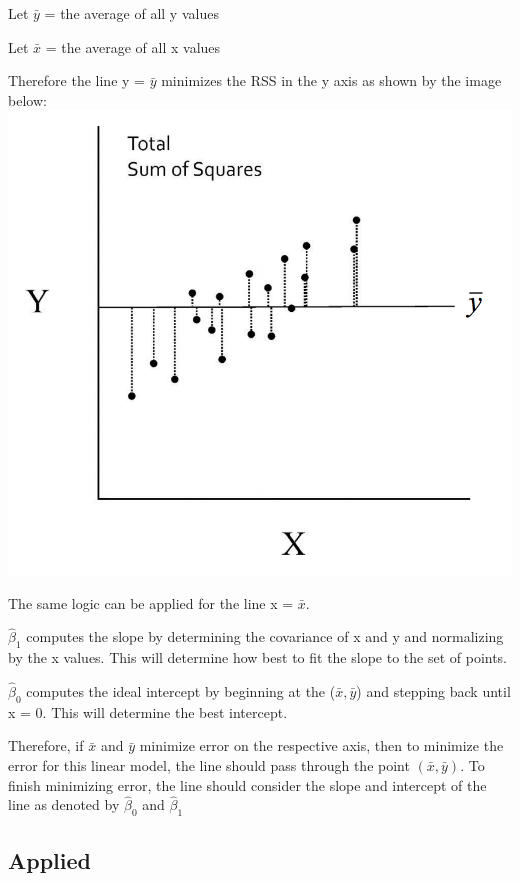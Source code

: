 \documentclass[11pt]{article}
\makeatletter
\def\maxwidth{\ifdim\Gin@nat@width>\linewidth\linewidth
    \else\Gin@nat@width\fi}
\let\Oldincludegraphics\includegraphics
\renewcommand{\includegraphics}[1]{\Oldincludegraphics[width=.8\maxwidth]{#1}}
\makeatother
\begin{document}
    Let \(\bar{y}\) = the average of all y values

Let \(\bar{x}\) = the average of all x values

Therefore the line y = \(\bar{y}\) minimizes the RSS in the y axis as
shown by the image below: \includegraphics{rssY}

The same logic can be applied for the line x = \(\bar{x}\).

\(\hat{\beta}_1\) computes the slope by determining the covariance of x
and y and normalizing by the x values. This will determine how best to
fit the slope to the set of points.

\(\hat{\beta}_0\) computes the ideal intercept by beginning at the
(\(\bar{x}, \bar{y}\)) and stepping back until x = 0. This will
determine the best intercept.

Therefore, if \(\bar{x}\) and \(\bar{y}\) minimize error on the
respective axis, then to minimize the error for this linear model, the
line should pass through the point \((\bar{x}, \bar{y})\). To finish
minimizing error, the line should consider the slope and intercept of
the line as denoted by \(\hat{\beta}_0\) and \(\hat{\beta}_1\)

    

    

    \subsection{Applied}\label{applied}
\end{document}
